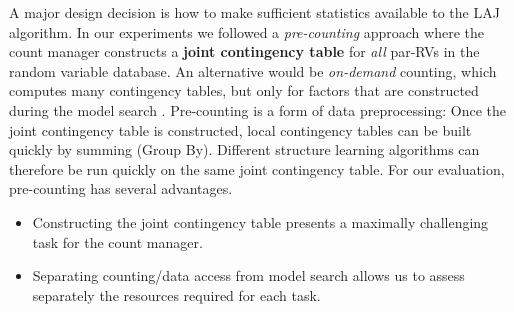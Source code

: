  A major design decision is how to make sufficient statistics available to the LAJ algorithm. In our experiments we followed a {\em pre-counting} approach where the count manager constructs a \textbf{joint contingency table} for {\em all} par-RVs in the random variable database. An alternative would be {\em on-demand} counting, which computes many contingency tables, but only for factors that are constructed during the model search \cite{Lv2012}. 
Pre-counting is a form of data preprocessing: Once the joint contingency table is constructed, local contingency tables can be built quickly by summing (Group By). Different structure learning algorithms can therefore be run quickly on the same joint contingency table. 
%
For our evaluation, pre-counting has several advantages. 

\begin{itemize}
\item Constructing the joint contingency table presents a maximally challenging task for the count manager.
\item Separating counting/data access from model search allows us to assess separately the resources required for each task.
\end{itemize}

